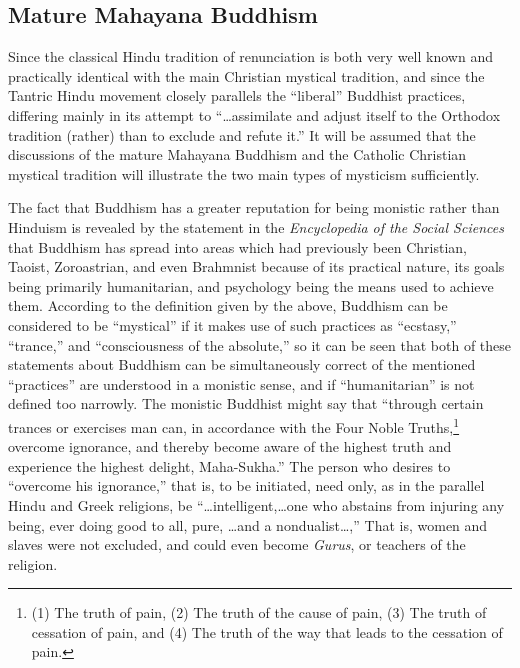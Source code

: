 \subsection{Mature Mahayana Buddhism}

Since the classical Hindu tradition of renunciation is both very well
known and practically identical with the main Christian
mystical tradition, and since the Tantric Hindu movement
closely parallels the \enquote{liberal} Buddhist practices, differing
mainly in its attempt to \enquote{\dots assimilate and adjust itself to
the Orthodox tradition (rather) than to exclude and refute it.}\supercite{heinrich:philosophies-india}
It will be assumed that the discussions of the mature
Mahayana Buddhism and the Catholic Christian mystical tradition
will illustrate the two main types of mysticism sufficiently.

\label{self:01}

The fact that Buddhism has a greater reputation for being
monistic rather than Hinduism is revealed by the statement in the
\emph{Encyclopedia of the Social Sciences} that Buddhism has spread
into areas which had previously been Christian, Taoist,
Zoroastrian, and even Brahmnist because of its practical
nature, its goals being primarily humanitarian, and psychology
being the means used to achieve them. According to the definition
given by the above, Buddhism can be considered to be
\enquote{mystical} if it makes use of such practices as \enquote{ecstasy,}
\enquote{trance,} and \enquote{consciousness of the absolute,} so it can be
seen that both of these statements about Buddhism can be
simultaneously correct of the mentioned \enquote{practices} are
understood in a monistic sense, and if \enquote{humanitarian} is
not defined too narrowly. The monistic Buddhist might say
that \enquote{through certain trances or exercises man can, in
accordance with the Four Noble Truths,\footnote{(1) The truth of pain, (2) The truth of the cause of pain, (3) The truth of cessation of pain, and (4) The truth of the way that leads to the cessation of pain.\supercite{noss:mans-religions}}
overcome ignorance, and thereby become aware of the highest truth and experience
the highest delight, Maha-Sukha.} The person who desires to
\enquote{overcome his ignorance,} that is, to be initiated, need
only, as in the parallel Hindu and Greek religions, be
\enquote{\dots intelligent,\dots one who abstains from injuring any being,
ever doing good to all, pure, \dots and a nondualist\dots,}\supercite{heinrich:philosophies-india}
That is, women and slaves were not excluded, and could even
become \emph{Gurus}, or teachers of the religion.

